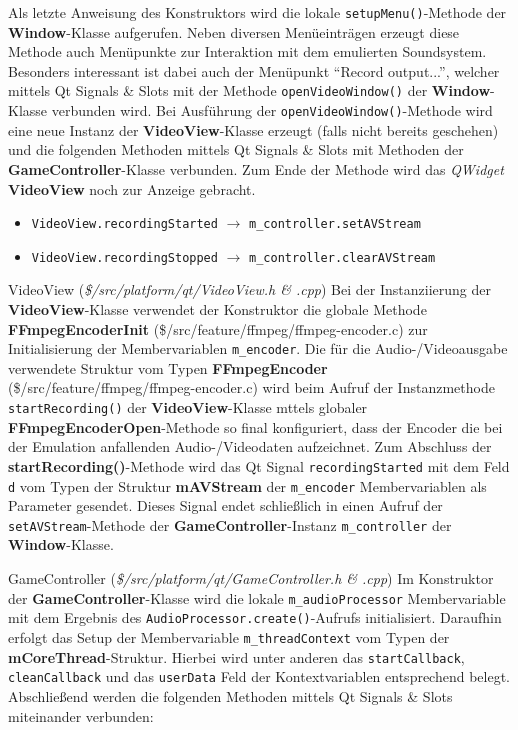 \documentclass[11pt,a4paper]{scrartcl}
\begin{document}
Als letzte Anweisung des Konstruktors wird die lokale \verb|setupMenu()|-Methode der \textbf{Window}-Klasse aufgerufen. Neben diversen Men\"ueintr\"agen erzeugt diese Methode auch Men\"upunkte zur Interaktion mit dem emulierten Soundsystem. Besonders interessant ist dabei auch der Men\"upunkt \enquote{Record output...}, welcher mittels Qt Signals \& Slots mit der Methode \verb|openVideoWindow()| der \textbf{Window}-Klasse verbunden wird. Bei Ausf\"uhrung der \verb|openVideoWindow()|-Methode wird eine neue Instanz der \textbf{VideoView}-Klasse erzeugt (falls nicht bereits geschehen) und die folgenden Methoden mittels Qt Signals \& Slots mit Methoden der \textbf{GameController}-Klasse verbunden. Zum Ende der Methode wird das \textit{QWidget} \textbf{VideoView} noch zur Anzeige gebracht.

\begin{itemize}
    \item \verb|VideoView.recordingStarted| $\rightarrow$ \verb|m_controller.setAVStream|
    \item \verb|VideoView.recordingStopped| $\rightarrow$ \verb|m_controller.clearAVStream|
\end{itemize}


\vspace{5mm}
\large VideoView \normalsize(\textit{\$/src/platform/qt/VideoView.h \& .cpp})
\vspace{2mm}\newline
Bei der Instanziierung der \textbf{VideoView}-Klasse verwendet der Konstruktor die globale Methode \textbf{FFmpegEncoderInit} (\$/src/feature/ffmpeg/ffmpeg-encoder.c) zur Initialisierung der Membervariablen \verb|m_encoder|. Die f\"ur die Audio-/Videoausgabe verwendete Struktur vom Typen \textbf{FFmpegEncoder} (\$/src/feature/ffmpeg/ffmpeg-encoder.c) wird beim Aufruf der Instanzmethode \verb|startRecording()| der \textbf{VideoView}-Klasse mttels globaler \textbf{FFmpegEncoderOpen}-Methode so final konfiguriert, dass der Encoder die bei der Emulation anfallenden Audio-/Videodaten aufzeichnet. Zum Abschluss der \textbf{startRecording()}-Methode wird das Qt Signal \verb|recordingStarted| mit dem Feld \verb|d| vom Typen der Struktur \textbf{mAVStream} der \verb|m_encoder| Membervariablen als Parameter gesendet. Dieses Signal endet schlie{\ss}lich in einen Aufruf der \verb|setAVStream|-Methode der \textbf{GameController}-Instanz \verb|m_controller| der \textbf{Window}-Klasse.

\vspace{5mm}
\large GameController \normalsize(\textit{\$/src/platform/qt/GameController.h \& .cpp})
\vspace{2mm}\newline
Im Konstruktor der \textbf{GameController}-Klasse wird die lokale \verb|m_audioProcessor| Membervariable mit dem Ergebnis des \verb|AudioProcessor.create()|-Aufrufs initialisiert. Daraufhin erfolgt das Setup der Membervariable \verb|m_threadContext| vom Typen der \textbf{mCoreThread}-Struktur. Hierbei wird unter anderen das \verb|startCallback|, \verb|cleanCallback| und das \verb|userData| Feld der Kontextvariablen entsprechend belegt. Abschlie{\ss}end werden die folgenden Methoden mittels Qt Signals \& Slots miteinander verbunden:
\end{document}
